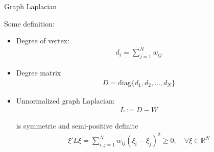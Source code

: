 \begin{point}
    Graph Laplacian 
\end{point}

Some definition:

\begin{itemize}[topsep=2pt,itemsep=0pt]
    \item Degree of vertex:
    \begin{align}
        d_i=\sum_{j=1}^Nw_{ij} 
    \end{align}
    \item Degree matrix
    \begin{align}
        D=\mathrm{diag}\{d_1,d_2,\ldots ,d_N\} 
    \end{align}
    \item Unnormalized graph Laplacian:
    \begin{align}
        L:= D-W
    \end{align}

    is symmetric and semi-positive definite
    \begin{align}
        \xi 'L\xi =\sum_{i,j=1}^Nw_{ij}(\xi _i-\xi _j)^2\geq 0,\quad\forall \xi \in\mathbb{R}^N 
    \end{align}
    
\end{itemize}

